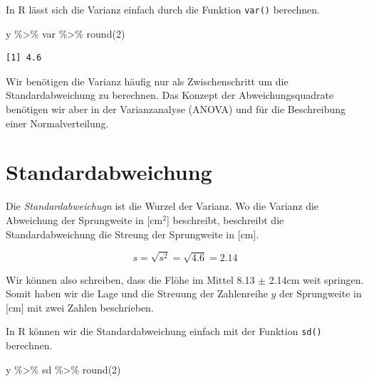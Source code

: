 \documentclass[
  letterpaper,
  DIV=11,
  oneside]{scrreport}
\newenvironment{Shaded}{\begin{snugshade}}{\end{snugshade}}
\newcommand{\DecValTok}[1]{\textcolor[rgb]{0.68,0.00,0.00}{#1}}
\newcommand{\FunctionTok}[1]{\textcolor[rgb]{0.28,0.35,0.67}{#1}}
\newcommand{\NormalTok}[1]{\textcolor[rgb]{0.00,0.23,0.31}{#1}}
\newcommand{\SpecialCharTok}[1]{\textcolor[rgb]{0.37,0.37,0.37}{#1}}
\begin{document}
In R lässt sich die Varianz einfach durch die Funktion \texttt{var()}
berechnen.

\begin{Shaded}
\begin{Highlighting}[]
\NormalTok{y }\SpecialCharTok{\%\textgreater{}\%}\NormalTok{ var }\SpecialCharTok{\%\textgreater{}\%} \FunctionTok{round}\NormalTok{(}\DecValTok{2}\NormalTok{) }
\end{Highlighting}
\end{Shaded}

\begin{verbatim}
[1] 4.6
\end{verbatim}

Wir benötigen die Varianz häufig nur als Zwischenschritt um die
Standardabweichung zu berechnen. Das Konzept der Abweichungsquadrate
benötigen wir aber in der Varianzanalyse (ANOVA) und für die
Beschreibung einer Normalverteilung.

\hypertarget{standardabweichung}{%
\section{Standardabweichung}\label{standardabweichung}}

Die \emph{Standardabweichugn} ist die Wurzel der Varianz. Wo die Varianz
die Abweichung der Sprungweite in {[}cm\(^2\){]} beschreibt, beschreibt
die Standardabweichung die Streung der Sprungweite in {[}cm{]}.

\[
s = \sqrt{s^2} = \sqrt{4.6} = 2.14
\] {}

Wir können also schreiben, dass die Flöhe im Mittel 8.13 \(\pm\) 2.14cm
weit springen. Somit haben wir die Lage und die Streuung der Zahlenreihe
\(y\) der Sprungweite in {[}cm{]} mit zwei Zahlen beschrieben.

In R können wir die Standardabweichung einfach mit der Funktion
\texttt{sd()} berechnen.

\begin{Shaded}
\begin{Highlighting}[]
\NormalTok{y }\SpecialCharTok{\%\textgreater{}\%}\NormalTok{ sd }\SpecialCharTok{\%\textgreater{}\%} \FunctionTok{round}\NormalTok{(}\DecValTok{2}\NormalTok{) }
\end{Highlighting}
\end{Shaded}
\end{document}
